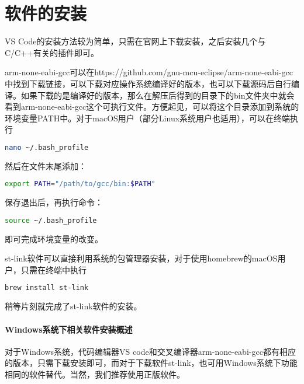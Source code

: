 \section{软件的安装}
VS Code的安装方法较为简单，只需在官网上下载安装，之后安装几个与C/C++有关的插件即可。
\par 
arm-none-eabi-gcc可以在https://github.com/gnu-mcu-eclipse/arm-none-eabi-gcc中找到下载链接，可以下载对应操作系统编译好的版本，也可以下载源码后自行编译。如果下载的是编译好的版本，那么在解压后得到的目录下的bin文件夹中就会看到arm-none-eabi-gcc这个可执行文件。方便起见，可以将这个目录添加到系统的环境变量PATH中。对于macOS用户（部分Linux系统用户也适用），可以在终端执行
\par 
\begin{lstlisting}[language=bash, style=customStyleBashLight]
nano ~/.bash_profile
\end{lstlisting}
\par 
然后在文件末尾添加：
\par 
\begin{lstlisting}[language=bash, style=customStyleBashLight]
export PATH="/path/to/gcc/bin:$PATH"
\end{lstlisting}
\par 
保存退出后，再执行命令：
\par 
\begin{lstlisting}[language=bash, style=customStyleBashLight]
source ~/.bash_profile
\end{lstlisting}
\par
即可完成环境变量的改变。
\par 
st-link软件可以直接利用系统的包管理器安装，对于使用homebrew的macOS用户，只需在终端中执行
\par 
\begin{lstlisting}[language=bash, style=customStyleBashLight]
brew install st-link
\end{lstlisting}
\par
稍等片刻就完成了st-link软件的安装。

\paragraph{Windows系统下相关软件安装概述}
对于Windows系统，代码编辑器VS code和交叉编译器arm-none-eabi-gcc都有相应的版本，只需下载安装即可，而对于下载软件st-link，也可用Windows系统下功能相同的软件替代。当然，我们推荐使用正版软件。

